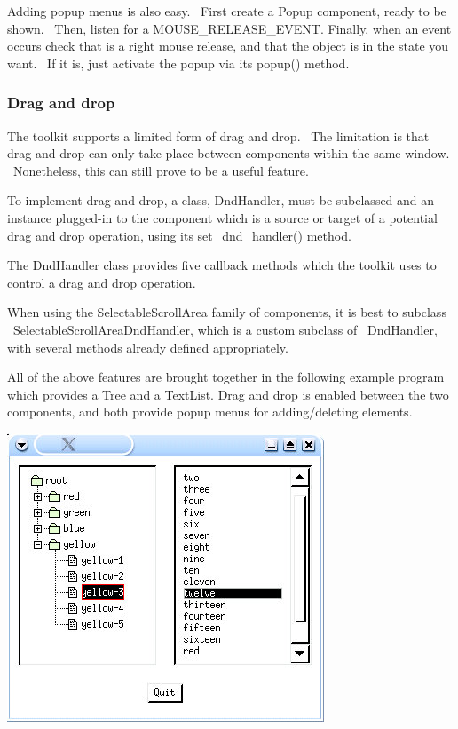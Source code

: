 Adding popup menus is also easy. \ First create a \textsf{Popup}
component, ready to be shown. \ Then, listen for a
\textsf{MOUSE\_RELEASE\_EVENT}. Finally, when an event occurs check
that is a right mouse release, and that the object is in the state you
want. \ If it is, just activate the popup via its \textsf{popup()}
method.

\subsubsection{Drag and drop}

The toolkit supports a limited form of drag and drop. \ The limitation
is that drag and drop can only take place between components within the
same window. \ Nonetheless, this can still prove to be a useful
feature.

To implement drag and drop, a class, \textsf{DndHandler}, must be
subclassed and an instance {\textquotedbl}plugged-in{\textquotedbl} to
the component which is a source or target of a potential drag and drop
operation, using its \textsf{set\_dnd\_handler()} method.

The \textsf{DndHandler} class provides five callback methods which the
toolkit uses to control a drag and drop operation.

When using the \textsf{SelectableScrollArea} family of components, it is
best to subclass \ \textsf{SelectableScrollAreaDndHandler}, which is a
custom subclass of \ \textsf{DndHandler}, with several methods already
defined appropriately.

All of the above features are brought together in the following example
program which provides a \textsf{Tree} and a \textsf{TextList}. Drag
and drop is enabled between the two components, and both provide popup
menus for adding/deleting elements.

\bigskip

\bigskip

\begin{center}
\includegraphics[width=3.7189in,height=3.3846in]{ub-img/ub-img59.jpg}
\end{center}

